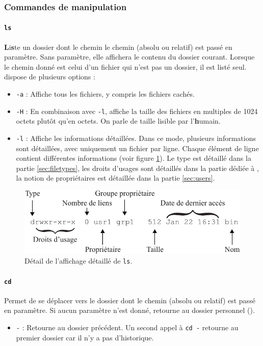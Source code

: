 \subsubsection{Commandes de manipulation}

\paragraph{\texttt{ls}} 
\textbf{L}i\textbf{s}te un dossier dont le chemin le chemin (absolu ou relatif) est passé en paramètre. Sans paramètre, elle affichera le contenu du dossier courant. Lorsque le chemin donné est celui d'un fichier qui n'est pas un dossier, il est listé seul. \newline
{} dispose de plusieurs options : 
\begin{itemize}
    \item \texttt{-a} : Affiche tous les fichiers, y compris les fichiers cachés. 
    \item \texttt{-H} : En combinaison avec \texttt{-l}, affiche la taille des fichiers en multiples de 1024 octets plutôt qu'en octets. On parle de taille lisible par l'\textbf{h}umain.
    \item \texttt{-l} : Affiche les informations détaillées.
    Dans ce mode, plusieurs informations sont détaillées, avec uniquement un fichier par ligne. Chaque élément de ligne contient différentes informations (voir figure \ref{fig:lsl}). Le type est détaillé dans la partie \ref{sec:filetypes}, les droits d'usages sont détaillés dans la partie dédiée à , la notion de propriétaires est détaillée dans la partie \ref{sec:users}.
\end{itemize}

\begin{figure}[h!]
        \includegraphics{res/lsl.pdf}
        \centering
        \caption{Détail de l'affichage détaillé de \texttt{ls}.}
    \label{fig:lsl}
\end{figure}

\paragraph{\texttt{cd}} 
Permet de se déplacer vers le dossier dont le chemin (absolu ou relatif) est passé en paramètre. Si aucun paramètre n'est donné, retourne au dossier personnel (\texttt{\tilde}).
\begin{itemize}
    \item \texttt{-} : Retourne au dossier précédent. Un second appel à \texttt{cd -} retourne au premier dossier car il n'y a pas d'historique.
\end{itemize}
\vspace{3mm}

